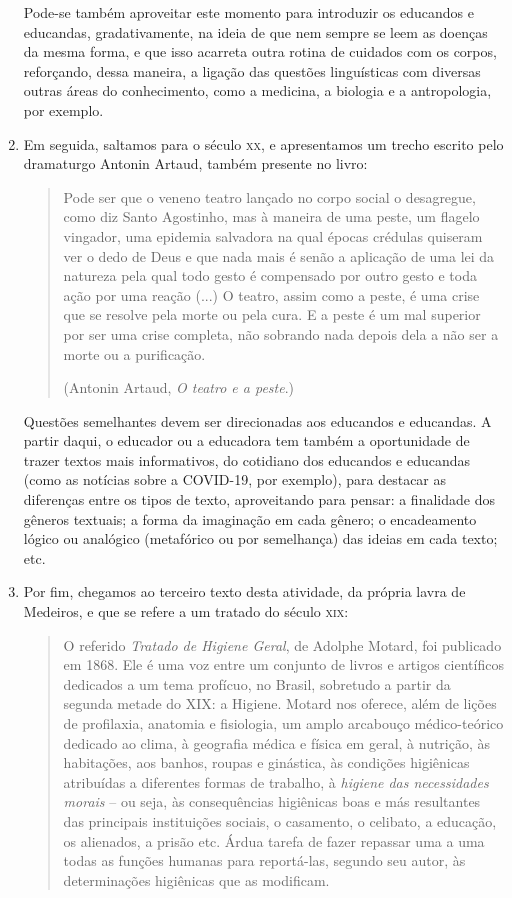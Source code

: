 \documentclass[12pt]{extarticle}
\begin{document}
\begin{enumerate}
Pode-se também aproveitar este momento para introduzir os educandos e
educandas, gradativamente, na ideia de que nem sempre se leem as doenças
da mesma forma, e que isso acarreta outra rotina de cuidados com os
corpos, reforçando, dessa maneira, a ligação das questões linguísticas
com diversas outras áreas do conhecimento, como a medicina, a biologia e
a antropologia, por exemplo.

\item Em seguida, saltamos para o século \textsc{xx}, e apresentamos um trecho escrito
pelo dramaturgo Antonin Artaud, também presente no livro:

\begin{quote}
Pode ser que o veneno teatro lançado no corpo social o desagregue, como
diz Santo Agostinho, mas à maneira de uma peste, um flagelo vingador,
uma epidemia salvadora na qual épocas crédulas quiseram ver o dedo de
Deus e que nada mais é senão a aplicação de uma lei da natureza pela
qual todo gesto é compensado por outro gesto e toda ação por uma reação
(...) O teatro, assim como a peste, é uma crise que se resolve pela
morte ou pela cura. E a peste é um mal superior por ser uma crise
completa, não sobrando nada depois dela a não ser a morte ou a
purificação.

(Antonin Artaud, \emph{O teatro e a peste}.)
\end{quote}

Questões semelhantes devem ser direcionadas aos educandos e educandas. A
partir daqui, o educador ou a educadora tem também a oportunidade de
trazer textos mais informativos, do cotidiano dos educandos e educandas
(como as notícias sobre a COVID-19, por exemplo), para destacar as
diferenças entre os tipos de texto, aproveitando para pensar: a
finalidade dos gêneros textuais; a forma da imaginação em cada gênero; o
encadeamento lógico ou analógico (metafórico ou por semelhança) das
ideias em cada texto; etc. 

\item Por fim, chegamos ao terceiro texto desta
atividade, da própria lavra de Medeiros, e que se refere a um tratado do
século \textsc{xix}:

\begin{quote}
O referido \emph{Tratado de Higiene Geral}, de Adolphe Motard, foi
publicado em 1868. Ele é uma voz entre um conjunto de livros e artigos
científicos dedicados a um tema profícuo, no Brasil, sobretudo a partir
da segunda metade do XIX: a Higiene. Motard nos oferece, além de lições
de profilaxia, anatomia e fisiologia, um amplo arcabouço médico-teórico
dedicado ao clima, à geografia médica e física em geral, à nutrição, às
habitações, aos banhos, roupas e ginástica, às condições higiênicas
atribuídas a diferentes formas de trabalho, à \emph{higiene das
necessidades morais} -- ou seja, às consequências higiênicas boas e más
resultantes das principais instituições sociais, o casamento, o
celibato, a educação, os alienados, a prisão etc. Árdua tarefa de fazer
repassar uma a uma todas as funções humanas para reportá-las, segundo
seu autor, às determinações higiênicas que as modificam.


\end{quote}
\end{enumerate}
\end{document}
